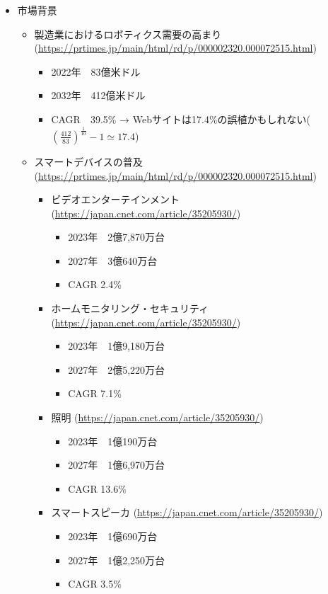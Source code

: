 \begin{itemize}
	\item 市場背景
	\begin{itemize}
		\item 製造業におけるロボティクス需要の高まり (\url{https://prtimes.jp/main/html/rd/p/000002320.000072515.html})
		\begin{itemize}
			\item 2022年　83億米ドル
			\item 2032年　412億米ドル
			\item CAGR　39.5\% → Webサイトは17.4\%の誤植かもしれない($(\frac{412}{83})^{\frac{1}{10}}-1\simeq17.4$)
		\end{itemize}
		\item スマートデバイスの普及 (\url{https://prtimes.jp/main/html/rd/p/000002320.000072515.html})
		\begin{itemize}
			\item ビデオエンターテインメント (\url{https://japan.cnet.com/article/35205930/})
			\begin{itemize}
				\item 2023年　2億7,870万台
				\item 2027年　3億640万台
				\item CAGR 2.4\%
			\end{itemize}
			\item ホームモニタリング・セキュリティ (\url{https://japan.cnet.com/article/35205930/})
			\begin{itemize}
				\item 2023年　1億9,180万台
				\item 2027年　2億5,220万台
				\item CAGR 7.1\%
			\end{itemize}
			\item 照明 (\url{https://japan.cnet.com/article/35205930/})
			\begin{itemize}
				\item 2023年　1億190万台
				\item 2027年　1億6,970万台
				\item CAGR 13.6\%
			\end{itemize}
			\item スマートスピーカ (\url{https://japan.cnet.com/article/35205930/})
			\begin{itemize}
				\item 2023年　1億690万台
				\item 2027年　1億2,250万台
				\item CAGR 3.5\%

\end{itemize}
\end{itemize}
\end{itemize}
\end{itemize}
